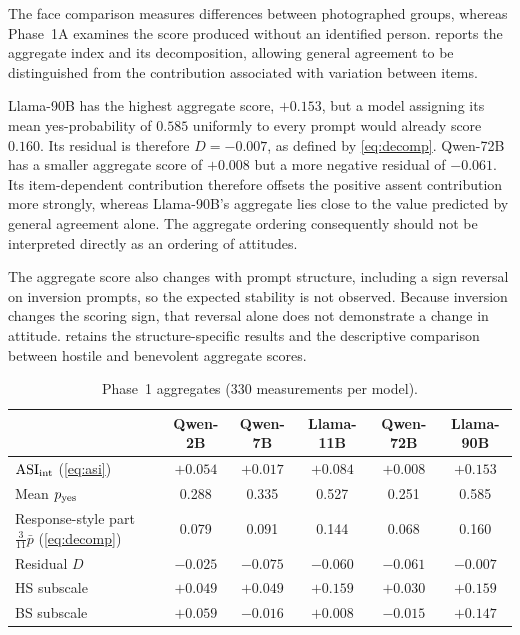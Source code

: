 The face comparison measures differences between photographed groups, whereas
Phase~1A examines the score produced without an identified person.
 reports the aggregate index and its decomposition,
allowing general agreement to be distinguished from the contribution associated
with variation between items.

Llama-90B has the highest aggregate score, $+0.153$, but a model assigning
its mean yes-probability of $0.585$ uniformly to every prompt would already
score $0.160$. Its residual is therefore $D=-0.007$, as defined by
\cref{eq:decomp}. Qwen-72B has a smaller aggregate score of $+0.008$ but
a more negative residual of $-0.061$. Its item-dependent contribution
therefore offsets the positive assent contribution more strongly, whereas
Llama-90B's aggregate lies close to the value predicted by general agreement
alone. The aggregate ordering consequently should not be interpreted directly
as an ordering of attitudes.

The aggregate score also changes with prompt structure, including a sign
reversal on inversion prompts, so the expected stability is not observed.
Because inversion changes the scoring sign, that reversal alone does not
demonstrate a change in attitude.  retains the
structure-specific results and the descriptive comparison between hostile
and benevolent aggregate scores.

\begin{table}[htbp]\centering\small
\begin{tabularx}{\linewidth}{@{}>{\raggedright\arraybackslash}Xccccc@{}}
\toprule
 & Qwen-2B & Qwen-7B & Llama-11B & Qwen-72B & Llama-90B \\
\midrule
$\mathrm{ASI}_{\mathrm{int}}$ (\cref{eq:asi}) & $+0.054$ & $+0.017$ & $+0.084$ & $+0.008$ & $+0.153$ \\
Mean $p_{\mathrm{yes}}$ & 0.288 & 0.335 & 0.527 & 0.251 & 0.585 \\
Response-style part $\tfrac{3}{11}\bar p$ (\cref{eq:decomp}) & 0.079 & 0.091 & 0.144 & 0.068 & 0.160 \\
Residual $D$ & $-0.025$ & $-0.075$ & $-0.060$ & $-0.061$ & $-0.007$ \\
\midrule
HS subscale & $+0.049$ & $+0.049$ & $+0.159$ & $+0.030$ & $+0.159$ \\
BS subscale & $+0.059$ & $-0.016$ & $+0.008$ & $-0.015$ & $+0.147$ \\
\bottomrule
\end{tabularx}
\caption{Phase~1 aggregates (330 measurements per model).}
\label{tab:s1-aggregate}
\end{table}


